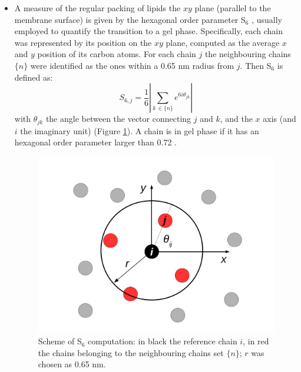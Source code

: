 \begin{itemize}
\item A measure of the regular packing of lipids the $xy$ plane (parallel to the membrane surface) is given by the hexagonal order parameter S$_6$ \citep{Uppulury2015}, usually employed to quantify the transition to a gel phase. Specifically, each chain was represented by its position on the $xy$ plane, computed as the average $x$ and $y$ position of its carbon atoms.
%
For each chain $j$ the neighbouring chains $\{n\}$ were identified as the ones within a 0.65 nm radius from $j$. Then S$_6$ is defined as:
\begin{equation}
S_{6,j} = \frac{1}{6} \left| \sum_{k \,\in \{n\}} e^{6i\theta_{jk}} \right|
\end{equation}
with $\theta_{jk}$ the angle between the vector connecting $j$ and $k$, and the $x$ axis (and $i$ the imaginary unit) (Figure \ref{fig:S6_theory}). A chain is in gel phase if it has an hexagonal order parameter larger than 0.72 \citep{Uppulury2015}.
\begin{figure}[t!]
\centering
\includegraphics[width=0.55\linewidth]{3results_capsule/pics/s6_theory.pdf}
\caption[Scheme of S$_6$ computation]{Scheme of S$_6$ computation: in black the reference chain $i$, in red the chains belonging to the neighbouring chains set $\{n\}$; $r$ was chosen as 0.65 nm.} \label{fig:S6_theory}
\end{figure}


\end{itemize}
